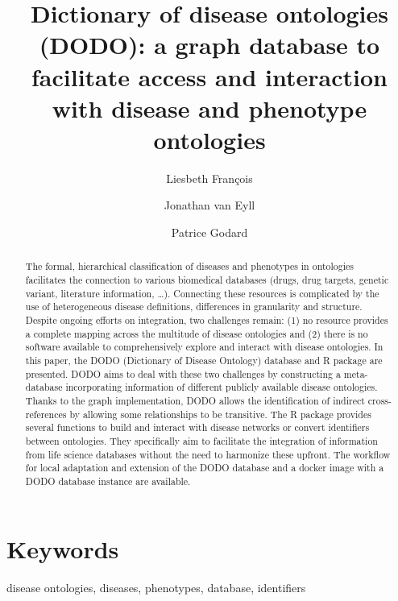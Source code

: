 \documentclass[9pt,a4paper,]{extarticle}
\begin{document}
\pagestyle{front}

\title{Dictionary of disease ontologies (DODO): a graph database to facilitate access and interaction with disease and phenotype ontologies}

\author[1]{Liesbeth François}
\author[2]{Jonathan van Eyll}
\author[2]{Patrice Godard}

\maketitle
\thispagestyle{front}

\begin{abstract}
The formal, hierarchical classification of diseases and phenotypes in ontologies facilitates the connection to various biomedical databases (drugs, drug targets, genetic variant, literature information, \ldots). Connecting these resources is complicated by the use of heterogeneous disease definitions, differences in granularity and structure. Despite ongoing efforts on integration, two challenges remain: (1) no resource provides a complete mapping across the multitude of disease ontologies and (2) there is no software available to comprehensively explore and interact with disease ontologies. In this paper, the DODO (Dictionary of Disease Ontology) database and R package are presented. DODO aims to deal with these two challenges by constructing a meta-database incorporating information of different publicly available disease ontologies. Thanks to the graph implementation, DODO allows the identification of indirect cross-references by allowing some relationships to be transitive. The R package provides several functions to build and interact with disease networks or convert identifiers between ontologies. They specifically aim to facilitate the integration of information from life science databases without the need to harmonize these upfront. The workflow for local adaptation and extension of the DODO database and a docker image with a DODO database instance are available.
\end{abstract}

\section*{Keywords}
disease ontologies, diseases, phenotypes, database, identifiers


\clearpage
\pagestyle{main}
\end{document}
